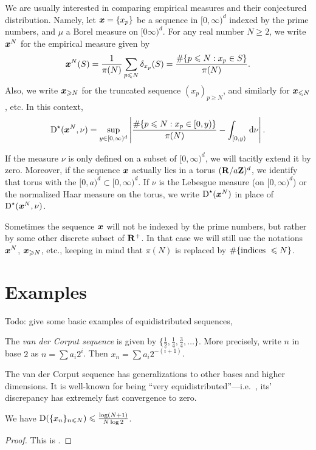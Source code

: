 We are usually interested in comparing empirical measures and their conjectured 
distribution. Namely, let ${\boldsymbol x} = \{x_p\}$ be a sequence in $[0,\infty)^d$ 
indexed by the prime numbers, and $\mu$ a Borel measure on $[0\infty)^d$. For 
any real number $N\geqslant 2$, we write ${\boldsymbol x}^N$ for the empirical measure 
given by 
\[
	{\boldsymbol x}^N(S) = \frac{1}{\pi(N)} \sum_{p\leqslant N} \delta_{x_p}(S) = \frac{\# \{p\leqslant N : x_p\in S\}}{\pi(N)} .
\]
Also, we write ${\boldsymbol x}_{\geqslant N}$ for the truncated sequence 
$(x_p)_{p\geqslant N}$, and similarly for ${\boldsymbol x}_{\leqslant N}$, etc. In this 
context, 
\[
	\operatorname{D}^\star({\boldsymbol x}^N,\nu) = \sup_{y\in [0,\infty)^d} \left| \frac{\# \{p\leqslant N : x_p \in [0,y)\}}{\pi(N)} - \int_{[0,y)} \, \mathrm{d}\nu\right| .
\]

If the measure $\nu$ is only defined on a subset of $[0,\infty)^d$, we will 
tacitly extend it by zero. Moreover, if the sequence ${\boldsymbol x}$ actually lies in a 
torus $(\mathbf{R}/a \mathbf{Z})^d$, we identify that torus with the 
$[0,a)^d\subset [0,\infty)^d$. If $\nu$ is the Lebesgue measure (on 
$[0,\infty)^d$) or the normalized Haar measure on the torus, we write 
$\operatorname{D}^\star({\boldsymbol x}^N)$ in place of $\operatorname{D}^\star({\boldsymbol x}^N, \nu)$. 

Sometimes the sequence ${\boldsymbol x}$ will not be indexed by the prime numbers, but 
rather by some other discrete subset of $\mathbf{R}^+$. In that case we will still 
use the notations ${\boldsymbol x}^N$, ${\boldsymbol x}_{\geqslant N}$, etc., keeping in mind that 
$\pi(N)$ is replaced by $\#\{\textnormal{indices }\leqslant N\}$. 





\section{Examples}
Todo: give some basic examples of equidistributed sequences, 


\begin{definition}
The \emph{van der Corput sequence} is given by 
$\{\frac 1 2,\frac 1 4,\frac 3 4,\dots\}$. More precisely, write $n$ in base 
$2$ as $n = \sum a_i 2^i$. Then $x_n = \sum a_i 2^{-(i+1)}$. 
\end{definition}

The van der Corput sequence has generalizations to other bases and higher 
dimensions. It is well-known for being ``very equidistributed''---i.e.~, its' 
discrepancy has extremely fast convergence to zero. 

\begin{lemma}
We have $\operatorname{D}(\{x_n\}_{n\leqslant N}) \leqslant \frac{\log(N+1)}{N\log 2}$. 
\end{lemma}
\begin{proof}
This is \cite[Ch.~2 Th.~3.5]{kuipers-niederreiter-1974}. 
\end{proof}

